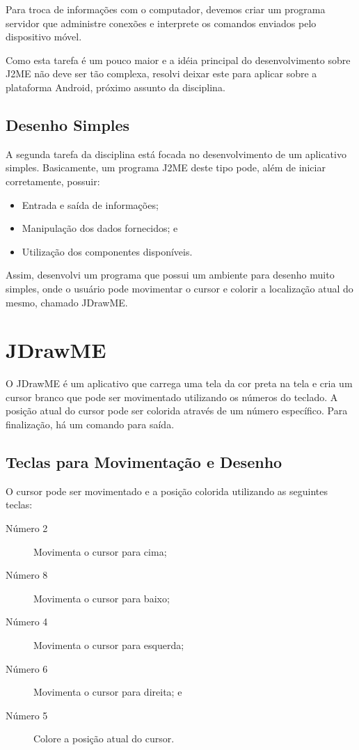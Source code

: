 \documentclass{article}
\begin{document}
Para troca de informações com o computador, devemos criar um programa servidor
que administre conexões e interprete os comandos enviados pelo dispositivo
móvel.

Como esta tarefa é um pouco maior e a idéia principal do desenvolvimento sobre
J2ME não deve ser tão complexa, resolvi deixar este para aplicar sobre a
plataforma Android, próximo assunto da disciplina.

\subsection{Desenho Simples}

A segunda tarefa da disciplina está focada no desenvolvimento de um aplicativo
simples. Basicamente, um programa J2ME deste tipo pode, além de iniciar
corretamente, possuir:

\begin{itemize}
  \item Entrada e saída de informações;
  \item Manipulação dos dados fornecidos; e
  \item Utilização dos componentes disponíveis.
\end{itemize}

Assim, desenvolvi um programa que possui um ambiente para desenho muito simples,
onde o usuário pode movimentar o cursor e colorir a localização atual do mesmo,
chamado JDrawME.

\section{JDrawME}
\label{sec:jdrawme}

O JDrawME é um aplicativo que carrega uma tela da cor preta na tela e cria um
cursor branco que pode ser movimentado utilizando os números do teclado. A
posição atual do cursor pode ser colorida através de um número específico. Para
finalização, há um comando para saída.

\subsection{Teclas para Movimentação e Desenho}

O cursor pode ser movimentado e a posição colorida utilizando as seguintes
teclas:

\begin{description}
\item[Número 2] Movimenta o cursor para cima;
\item[Número 8] Movimenta o cursor para baixo;
\item[Número 4] Movimenta o cursor para esquerda;
\item[Número 6] Movimenta o cursor para direita; e
\item[Número 5] Colore a posição atual do cursor.
\end{description}
\end{document}

